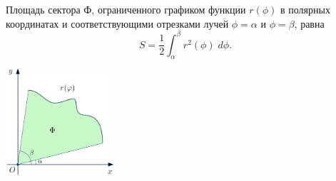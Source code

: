     \begin{theorem}
    	Площадь сектора Ф, ограниченного графиком функции $r(\phi)$ в полярных координатах и соответствующими отрезками лучей $\phi = \alpha$ и $\phi = \beta$, равна
    	\[ S = \frac{1}{2} \int_{\alpha}^{\beta} r^2(\phi) \; d\phi. \]
    \end{theorem}
    
    \begin{center}
    	\includegraphics[width=0.3\textwidth]{img/lecture33/the_area_of_the_figure2}
    \end{center}
    
